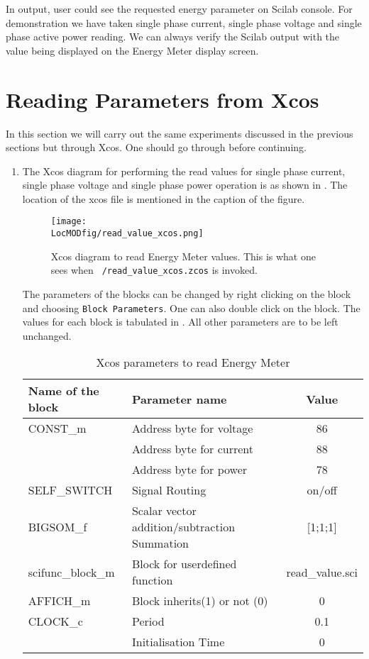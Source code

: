 In output, user could see the requested energy parameter on Scilab
console. For demonstration we have taken single phase current, single
phase voltage and single phase active power reading. We can always
verify the Scilab output with the value being displayed on the Energy
Meter display screen.

\section{Reading Parameters from Xcos}
In this section we will carry out the same experiments discussed in
the previous sections but through Xcos. One should go through
 before continuing.

\begin{enumerate}
\item The Xcos diagram for performing the read values for single phase
  current, single phase voltage and single phase power operation is as
  shown in . The location of the xcos file is
  mentioned in the caption of the figure.

\begin{figure}
    \centering
    \texttt{[image: \\LocMODfig/read\_value\_xcos.png]}
    \caption[Xcos diagram to read Energy Meter values]{Xcos diagram to
      read Energy Meter values.  This is what one sees when {\tt
        \LocMODscibrief/read\_value\_xcos.zcos} is invoked.}
    \label{fig:mod-read}
  \end{figure}
The parameters of the blocks can be changed by right clicking on the
block and choosing {\tt Block Parameters}. One can also double click
on the block. The values for each block is tabulated in
.  All other parameters are to be left
unchanged.

\begin{table}
    \centering
    \caption{Xcos parameters to read Energy Meter}
    \label{tab:mod-xcos-read}
    \begin{tabular}{llc} \hline
      Name of the block & Parameter name & Value \\ \hline
      CONST\_m & Address byte for voltage & 86  \\
      & Address byte for current & 88 \\ 
      & Address byte for power & 78\\ \hline
      SELF\_SWITCH & Signal Routing & on/off \\ \hline
      BIGSOM\_f & Scalar vector addition/subtraction Summation & [1;1;1] \\ \hline
      scifunc\_block\_m & Block for user\-defined function & read\_value.sci \\ \hline 
      AFFICH\_m & Block inherits(1) or not (0) & 0 \\ \hline
      CLOCK\_c & Period & 0.1 \\
      & Initialisation Time & 0 \\ \hline
    \end{tabular}
  \end{table}
\end{enumerate}

